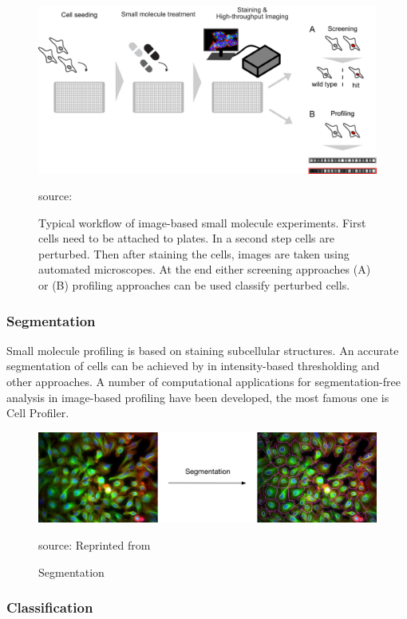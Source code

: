 \begin{figure}[H]
	\centering
	\includegraphics[width=0.8\linewidth]{bilder/cells/hcu.png}
	\caption{Typical workflow of image-based small molecule experiments. First cells need to be attached to plates. In a second step cells are perturbed. Then after staining the cells, images are taken using automated microscopes. At the end either screening approaches (A) or (B) profiling approaches can be used classify perturbed cells.}
	 source:\cite{Scheeder2018}
	\label{fig:Workflow}
\end{figure}

\subsubsection{Segmentation}

Small molecule profiling is based on staining subcellular structures.
An accurate segmentation of cells can be achieved by in intensity-based thresholding and other approaches. A number of computational applications for segmentation-free analysis in image-based profiling have been developed, the most famous one is Cell Profiler.


\begin{figure}[H]
	\centering
	\includegraphics[width=0.8\linewidth]{bilder/cells/segmentation.png}
	\caption{Segmentation}
	source: Reprinted from \cite{Pau}
	\label{fig:Segmentation}
\end{figure}


\subsubsection{Classification}



